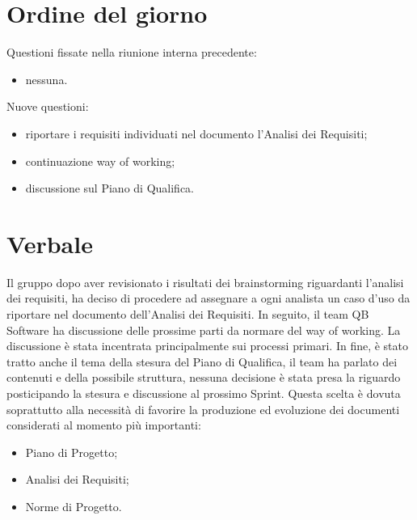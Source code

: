 \documentclass[12pt]{article}
\begin{document}
    \section{Ordine del giorno}
        Questioni fissate nella riunione interna precedente:
    	\begin{itemize}
    		\item nessuna.
    	\end{itemize}
    	Nuove questioni:
    	\begin{itemize}
			\item riportare i requisiti individuati nel documento l'Analisi dei Requisiti;
			\item continuazione way of working;
			\item discussione sul Piano di Qualifica.
    	\end{itemize}
    
    \section{Verbale}
		Il gruppo dopo aver revisionato i risultati dei brainstorming riguardanti l'analisi dei requisiti, ha deciso di procedere ad assegnare a ogni analista un caso d'uso da riportare nel documento dell'Analisi dei Requisiti. In seguito, il team QB Software ha discussione delle prossime parti da normare del way of working. La discussione è stata incentrata principalmente sui processi primari.
		In fine, è stato tratto anche il tema della stesura del Piano di Qualifica, il team ha parlato dei contenuti e della possibile struttura, nessuna decisione è stata presa la riguardo posticipando la stesura e discussione al prossimo Sprint. Questa scelta è dovuta soprattutto alla necessità di favorire la produzione ed evoluzione dei documenti considerati al momento più importanti:
		\begin{itemize}
			\item Piano di Progetto;
			\item Analisi dei Requisiti;
			\item Norme di Progetto.
		\end{itemize}
\end{document}
